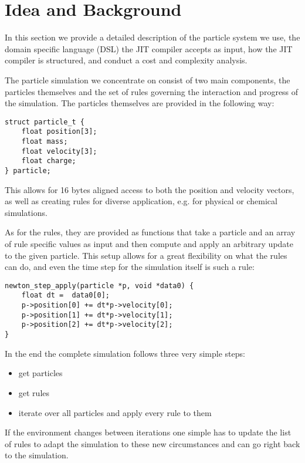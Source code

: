 \section{Idea and Background}\label{sec:background}

In this section we provide a detailed description of the particle system we use, the domain specific language (DSL) the JIT compiler accepts as input, how the JIT compiler is structured, and conduct a cost and complexity analysis.

The particle simulation we concentrate on consist of two main components, the particles themselves and the set of rules governing the interaction and progress of the simulation. The particles themselves are provided in the following way:
\begin{lstlisting}
struct particle_t {
    float position[3];
    float mass;
    float velocity[3];
    float charge;
} particle;
\end{lstlisting}

This allows for 16 bytes aligned access to both the position and velocity vectors, as well as creating rules for diverse application, e.g. for physical or chemical simulations.

As for the rules, they are provided as functions that take a particle and an array of rule specific values as input and then compute and apply an arbitrary update to the given particle. This setup allows for a great flexibility on what the rules can do, and even the time step for the simulation itself is such a rule:

\begin{lstlisting}
newton_step_apply(particle *p, void *data0) {
    float dt =  data0[0];
    p->position[0] += dt*p->velocity[0];
    p->position[1] += dt*p->velocity[1];
    p->position[2] += dt*p->velocity[2];
}
\end{lstlisting}

In the end the complete simulation follows three very simple steps:
\begin{itemize}
\item get particles
\item get rules
\item iterate over all particles and apply every rule to them
\end{itemize}

If the environment changes between iterations one simple has to update the list of rules to adapt the simulation to these new circumstances and can go right back to the simulation.

